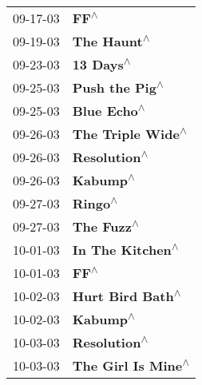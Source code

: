 \begin{supertabular}{p{0.25\columnwidth}p{0.75\columnwidth}}
 09-17-03 &                                                                       \textbf{FF\textsuperscript{$\wedge$}} \\
 09-19-03 &                                                                \textbf{The Haunt\textsuperscript{$\wedge$}} \\
 09-23-03 &                                                                  \textbf{13 Days\textsuperscript{$\wedge$}} \\
 09-25-03 &                                                             \textbf{Push the Pig\textsuperscript{$\wedge$}} \\
 09-25-03 &                                                                \textbf{Blue Echo\textsuperscript{$\wedge$}} \\
 09-26-03 &                                                          \textbf{The Triple Wide\textsuperscript{$\wedge$}} \\
 09-26-03 &                                                               \textbf{Resolution\textsuperscript{$\wedge$}} \\
 09-26-03 &                                                                   \textbf{Kabump\textsuperscript{$\wedge$}} \\
 09-27-03 &                                                                    \textbf{Ringo\textsuperscript{$\wedge$}} \\
 09-27-03 &                                                                 \textbf{The Fuzz\textsuperscript{$\wedge$}} \\
 10-01-03 &                                                           \textbf{In The Kitchen\textsuperscript{$\wedge$}} \\
 10-01-03 &                                                                       \textbf{FF\textsuperscript{$\wedge$}} \\
 10-02-03 &                                                           \textbf{Hurt Bird Bath\textsuperscript{$\wedge$}} \\
 10-02-03 &                                                                   \textbf{Kabump\textsuperscript{$\wedge$}} \\
 10-03-03 &                                                               \textbf{Resolution\textsuperscript{$\wedge$}} \\
 10-03-03 &                                                         \textbf{The Girl Is Mine\textsuperscript{$\wedge$}} \\

\end{supertabular}
